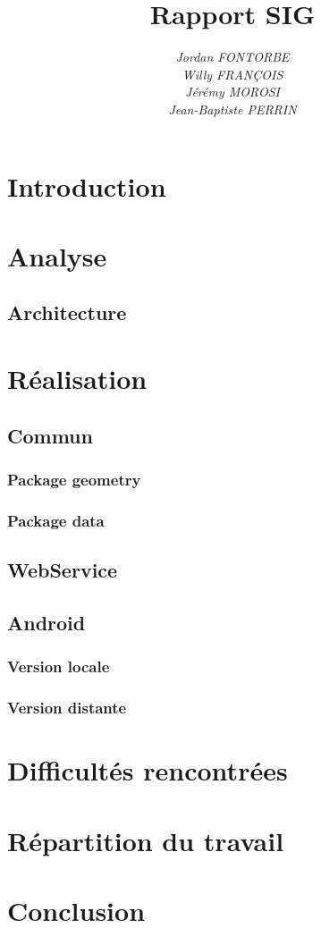 \documentclass[12pt,a4paper,oneside]{article}
\begin{document}
\title{\textbf{\Huge{Rapport SIG}}}
\author{
	\textit{Jordan FONTORBE}\\
	\textit{Willy FRANÇOIS}\\
	\textit{Jérémy MOROSI}\\
	\textit{Jean-Baptiste PERRIN}
}

\maketitle
\newpage

\tableofcontents
\newpage

\section{Introduction}


\section{Analyse}

\subsection{Architecture}


\section{Réalisation}

\subsection{Commun}
\subsubsection{Package geometry}
\subsubsection{Package data}

\subsection{WebService}

\subsection{Android}
\subsubsection{Version locale}
\subsubsection{Version distante}


\section{Difficultés rencontrées}


\section{Répartition du travail}


\section{Conclusion}


\appendix
\end{document}
